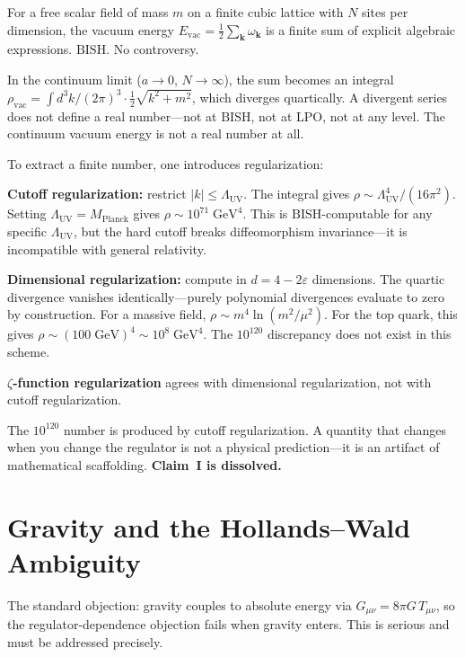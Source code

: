 \documentclass[11pt,a4paper]{report}
\theoremstyle{plain}
\theoremstyle{definition}
\theoremstyle{remark}
\newcommand{\BISH}{\mathrm{BISH}}
\newcommand{\LPO}{\mathrm{LPO}}
\begin{document}
For a free scalar field of mass $m$ on a finite cubic lattice with $N$ sites per dimension, the vacuum energy $E_{\mathrm{vac}} = \tfrac{1}{2}\sum_{\mathbf{k}} \omega_{\mathbf{k}}$ is a finite sum of explicit algebraic expressions. $\BISH$. No controversy.

In the continuum limit ($a \to 0$, $N \to \infty$), the sum becomes an integral $\rho_{\mathrm{vac}} = \int d^3k/(2\pi)^3 \cdot \tfrac{1}{2}\sqrt{k^2 + m^2}$, which diverges quartically. A divergent series does not define a real number---not at $\BISH$, not at $\LPO$, not at any level. The continuum vacuum energy is not a real number at all.

To extract a finite number, one introduces regularization:

\textbf{Cutoff regularization:} restrict $|k| \leq \Lambda_{\mathrm{UV}}$. The integral gives $\rho \sim \Lambda_{\mathrm{UV}}^4/(16\pi^2)$. Setting $\Lambda_{\mathrm{UV}} = M_{\mathrm{Planck}}$ gives $\rho \sim 10^{71}\;\mathrm{GeV}^4$. This is $\BISH$-computable for any specific $\Lambda_{\mathrm{UV}}$, but the hard cutoff breaks diffeomorphism invariance---it is incompatible with general relativity.

\textbf{Dimensional regularization:} compute in $d = 4 - 2\varepsilon$ dimensions. The quartic divergence vanishes identically---purely polynomial divergences evaluate to zero by construction. For a massive field, $\rho \sim m^4\ln(m^2/\mu^2)$. For the top quark, this gives $\rho \sim (100\;\mathrm{GeV})^4 \sim 10^8\;\mathrm{GeV}^4$. The $10^{120}$ discrepancy does not exist in this scheme.

\textbf{$\zeta$-function regularization} agrees with dimensional regularization, not with cutoff regularization.

The $10^{120}$ number is produced by cutoff regularization. A quantity that changes when you change the regulator is not a physical prediction---it is an artifact of mathematical scaffolding. \textbf{Claim~I is dissolved.}

\section{Gravity and the Hollands--Wald Ambiguity}

The standard objection: gravity couples to absolute energy via $G_{\mu\nu} = 8\pi G\, T_{\mu\nu}$, so the regulator-dependence objection fails when gravity enters. This is serious and must be addressed precisely.
\end{document}
